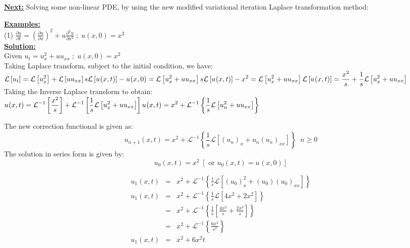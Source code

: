 \documentclass[12pt]{report}
\newcommand{\Laplace}{\mathcal{L}}
\newcommand{\sbracket}[1]{\left[#1\right]}
\newcommand{\Un}[2]{u_{#1}(#2)}
\newcommand{\NI}{\noindent}
\newcommand{\InverseL}[1]{\Laplace^{-1}\left[#1\right]}
\newcommand{\LT}[1]{\Laplace \left[#1\right]}
\newcommand{\Unx}[1]{\Un{#1}{x,t}}
\newcommand{\InverseLx}[1]{\Laplace^{-1}\left\{ #1 \right\}}
\begin{document}
\NI \textbf{\underline{Next:}} Solving some non-linear PDE, by using the new  modified variational iteration Laplace transformation method:

\newpage
\NI \textbf{\underline{Examples:}}\\[0.4cm]
(1) $\displaystyle
\frac{\partial u}{\partial t} = \left( \frac{\partial u}{\partial x}\right)^2 + u\frac{\partial^2 u}{\partial x^2} \; ; \; u(x,0) = x^2
$\\[0.4cm]
\NI \textbf{\underline{Solution:}}\\[0.2cm]
Given $\displaystyle u_t = u_{x}^{2} + u u_{xx} \; ; \; u(x,0) = x^2$\\[0.25cm]
Taking Laplace transform, subject to the initial condition, we  have:\\[0.2cm]
$\displaystyle
\LT{u_t} = \LT{u_{x}^{2}} + \LT{uu_{xx}}\\[0.2cm]
s\LT{\Un{}{x,t}} - \Un{}{x,0} = \LT{u_{x}^{2} + uu_{xx}} \\[0.2cm]
s\LT{\Un{}{x,t}} - x^2 = \LT{u_{x}^{2} + uu_{xx}} \\[0.2cm]
\LT{\Un{}{x,t}} = \frac{x^2}{s} + \frac{1}{s}\LT{u_{x}^{2} + uu_{xx}}
$\\[0.2cm]
Taking the Inverse Laplace transform to obtain:\\[0.3cm]
$\displaystyle
\Unx{} = \InverseL{\frac{x^2}{s}} + \InverseL{\frac{1}{s}\LT{u_{x}^{2} + uu_{xx}}} \\[0.2cm]
\Un{}{x,t} = x^2 + \InverseLx{\frac{1}{s}\LT{u_{n}^{2} + uu_{xx}}}
$

\NI The new correction functional is given as:
\begin{equation}
	\Unx{n+1} = x^2 + \InverseLx{\frac{1}{s}\LT{(u_n)_x + u_{n}(u_n)_{xx}}} \; \; n \geq 0
\end{equation}
The solution in series form is given by:\\[0.2cm]
\begin{equation}
	\Un{0}{x,t} = x^2 \; \sbracket{\text{ or } \Unx{0} = \Un{}{x,0}}
\end{equation}

\begin{eqnarray}
\Unx{1} &=& x^2 + \InverseLx{\frac{1}{s}\LT{\left(u_{0}\right)_{x}^{2} + \left(u_{0}\right)\left(u_{0}\right)_{xx}}} \nonumber   \\[0.1cm]
\Unx{1} &=& x^2 + \InverseLx{\frac{1}{s}\LT{4x^2 + 2x^2}}\nonumber \\[0.1cm]
&=& x^2 + \InverseLx{\frac{1}{s}\left[\frac{4x^2}{s} + \frac{2x^2}{s}\right]}\nonumber \\[0.1cm]
&=& x^2 + \InverseLx{\frac{6x^2}{s^2}}\nonumber \\[0.3cm]
\Unx{1} &=& x^2 + 6x^{2}t
\end{eqnarray}
\end{document}
